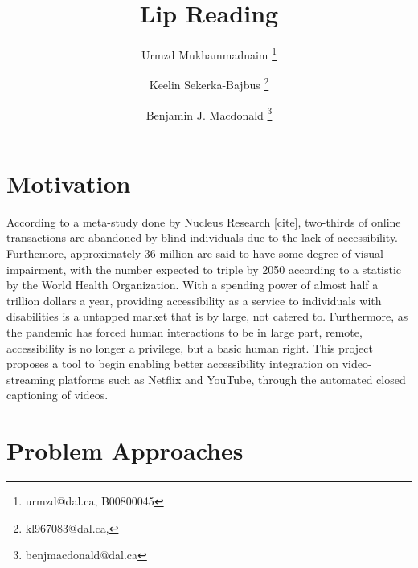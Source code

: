 \documentclass[11pt]{article}
\title{Lip Reading}
\author[1]{Urmzd Mukhammadnaim \thanks{urmzd@dal.ca, B00800045}}
\author[1]{Keelin Sekerka-Bajbus \thanks{kl967083@dal.ca, }}
\author[1]{Benjamin J. Macdonald \thanks{benjmacdonald@dal.ca}}
\affil[1]{Faculty of Computer Science, Dalhousie University}
\begin{document}
\maketitle

\section{Motivation}
According to a meta-study done by Nucleus Research [cite], two-thirds
of online transactions are abandoned by blind individuals due to the lack of accessibility.
Furthemore, approximately 36 million are said to have some degree of visual impairment, with the number
expected to triple by 2050 according to a statistic by the World Health Organization.
With a spending power of almost half a trillion dollars a year, providing accessibility
as a service to individuals with disabilities is a untapped market that is by large, not catered to.
Furthermore, as the pandemic has forced human interactions to be in large part, remote, accessibility is no longer
a privilege, but a basic human right. This project proposes a tool to begin enabling better accessibility
integration on video-streaming platforms such as Netflix and YouTube, through the automated
closed captioning of videos.

\section{Problem Approaches}
\end{document}

